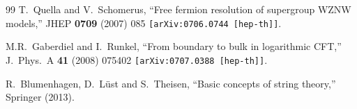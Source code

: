 \documentclass[12pt,a4paper]{article}
\begin{document}
\begin{thebibliography}{99}
T.~Quella and V.~Schomerus,
``Free fermion resolution of supergroup WZNW models,''
JHEP {\bf 0709} (2007) 085
{\tt [arXiv:0706.0744 [hep-th]]}.

M.R.~Gaberdiel and I.~Runkel,
``From boundary to bulk in logarithmic CFT,''
J.\ Phys.\ A {\bf 41} (2008) 075402
{\tt [arXiv:0707.0388 [hep-th]]}.

R.~Blumenhagen, D.~L\"ust and S.~Theisen,
``Basic concepts of string theory,'' Springer (2013).


\end{thebibliography}
\end{document}
